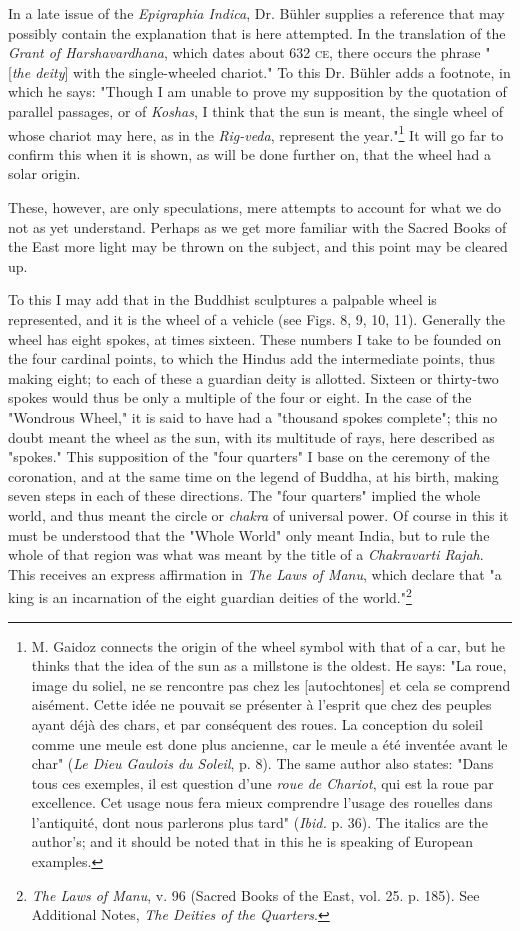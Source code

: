 \documentclass[a4paper, 11pt, oneside, polutonikogreek, english]{article}
\begin{document}
In a late issue of the \emph{Epigraphia Indica}, Dr. Bühler supplies a reference that may possibly contain the explanation that is here attempted. In the translation of the \emph{Grant of Harshavardhana}, which dates about 632 \textsc{ce}, there occurs the phrase "[\emph{the deity}] with the single-wheeled chariot." To this Dr. Bühler adds a footnote, in which he says: "Though I am unable to prove my supposition by the quotation of parallel passages, or of \emph{Koshas}, I think that the sun is meant, the single wheel of whose chariot may here, as in the \emph{Rig-veda}, represent the year."\footnote{M. Gaidoz connects the origin of the wheel symbol with that of a car, but he thinks that the idea of the sun as a millstone is the oldest. He says: "La roue, image du soliel, ne se rencontre pas chez les [autochtones] et cela se comprend aisément. Cette idée ne pouvait se présenter à l'esprit que chez des peuples ayant déjà des chars, et par conséquent des roues. La conception du soleil comme une meule est done plus ancienne, car le meule a été inventée avant le char" (\emph{Le Dieu Gaulois du Soleil}, p. 8). The same author also states: "Dans tous ces exemples, il est question d'une \emph{roue de Chariot}, qui est la roue par excellence. Cet usage nous fera mieux comprendre l'usage des rouelles dans l'antiquité, dont nous parlerons plus tard" (\emph{Ibid.} p. 36). The italics are the author's; and it should be noted that in this he is speaking of European examples.} It will go far to confirm this when it is shown, as will be done further on, that the wheel had a solar origin.

These, however, are only speculations, mere attempts to account for what we do not as yet understand. Perhaps as we get more familiar with the Sacred Books of the East more light may be thrown on the subject, and this point may be cleared up.

To this I may add that in the Buddhist sculptures a palpable wheel is represented, and it is the wheel of a vehicle (see Figs. 8, 9, 10, 11). Generally the wheel has eight spokes, at times sixteen. These numbers I take to be founded on the four cardinal points, to which the Hindus add the intermediate points, thus making eight; to each of these a guardian deity is allotted. Sixteen or thirty-two spokes would thus be only a multiple of the four or eight. In the case of the "Wondrous Wheel," it is said to have had a "thousand spokes complete"; this no doubt meant the wheel as the sun, with its multitude of rays, here described as "spokes." This supposition of the "four quarters" I base on the ceremony of the coronation, and at the same time on the legend of Buddha, at his birth, making seven steps in each of these directions. The "four quarters" implied the whole world, and thus meant the circle or \emph{chakra} of universal power. Of course in this it must be understood that the "Whole World" only meant India, but to rule the whole of that region was what was meant by the title of a \emph{Chakravarti Rajah}. This receives an express affirmation in \emph{The Laws of Manu}, which declare that "a king is an incarnation of the eight guardian deities of the world."\footnote{\emph{The Laws of Manu}, v. 96 (Sacred Books of the East, vol. 25. p. 185). See Additional Notes, \emph{The Deities of the Quarters}.}
\end{document}
